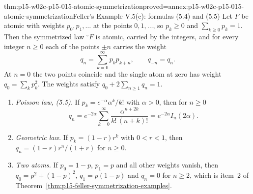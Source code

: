 \begin{hbtheorem}{thm:p15-w02c-p15-015-atomic-symmetrization}{proved=annex:p15-w02c-p15-015-atomic-symmetrization}{Feller's Example V.5(c): formulas (5.4) and (5.5)}
Let \(F\) be atomic with weights \(p_0,p_1,\ldots\) at the points
\(0,1,\ldots\), so \(p_k\geq0\) and \(\sum_{k\geq0}p_k=1\). Then the
symmetrized law \({}^{\circ}F\) is atomic, carried by the integers, and
for every integer \(n\geq0\) each of the points \(\pm n\) carries the
weight
\[
 q_n=\sum_{k=0}^\infty p_kp_{k+n},\qquad q_{-n}=q_n.
\]
At \(n=0\) the two points coincide and the single atom at zero has
weight \(q_0=\sum_kp_k^2\). The weights satisfy
\(q_0+2\sum_{n\geq1}q_n=1\).
\begin{enumerate}
\item \emph{Poisson law, (5.5).} If
\(p_k=e^{-\alpha}\alpha^k/k!\) with \(\alpha>0\), then for \(n\geq0\)
\[
 q_n=e^{-2\alpha}\sum_{k=0}^\infty\frac{\alpha^{n+2k}}{k!\,(n+k)!}
    =e^{-2\alpha}I_n(2\alpha).
\]
\item \emph{Geometric law.} If \(p_k=(1-r)r^k\) with \(0<r<1\), then
\(q_n=(1-r)r^n/(1+r)\) for \(n\geq0\).
\item \emph{Two atoms.} If \(p_0=1-p\), \(p_1=p\) and all other
weights vanish, then \(q_0=p^2+(1-p)^2\), \(q_1=p(1-p)\) and
\(q_n=0\) for \(n\geq2\), which is item~2 of
Theorem~\ref{thm:p15-feller-symmetrization-examples}.
\end{enumerate}
\end{hbtheorem}


